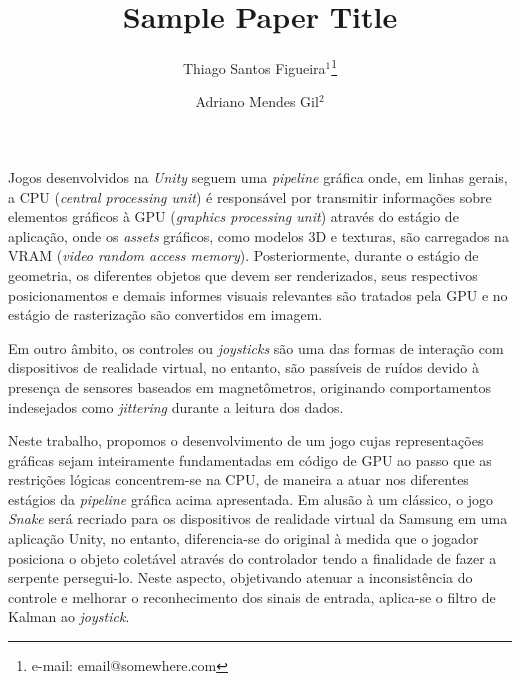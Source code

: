 \documentclass{vgtc}                          %
\title{Sample Paper Title}
\author{Thiago Santos Figueira$^{1}$\thanks{e-mail: email@somewhere.com} %
\and Adriano Mendes Gil$^{2}$}
\affiliation{\scriptsize $^{1}$Research institute X, Department, Country\\
$^{2}$University B, Department, Country\\
$^{3}$Company C, Department, Country}
\begin{document}


\maketitle

Jogos desenvolvidos na \textit{Unity} seguem uma \textit{pipeline} gráfica onde, em linhas gerais, a CPU (\textit{central processing unit}) é responsável por transmitir informações sobre elementos gráficos à GPU (\textit{graphics processing unit}) através do estágio de aplicação, onde os \textit{assets} gráficos, como modelos 3D e texturas, são carregados na VRAM (\textit{video random access memory}). Posteriormente, durante o estágio de geometria, os diferentes objetos que devem ser renderizados, seus respectivos posicionamentos e demais informes visuais relevantes são tratados pela GPU e no estágio de rasterização são convertidos em imagem\cite{akenine2008real}.

Em outro âmbito, os controles ou \textit{joysticks} são uma das formas de interação com dispositivos de realidade virtual, no entanto, são passíveis de ruídos devido à presença de sensores baseados em magnetômetros, originando comportamentos indesejados como \textit{jittering} durante a leitura dos dados. 

Neste trabalho, propomos o desenvolvimento de um jogo cujas representações gráficas sejam inteiramente fundamentadas em código de GPU ao passo que as restrições lógicas concentrem-se na CPU, de maneira a atuar nos diferentes estágios da \textit{pipeline} gráfica acima apresentada. Em alusão à um clássico, o jogo \textit{Snake} será recriado para os dispositivos de realidade virtual da Samsung em uma aplicação Unity, no entanto, diferencia-se do original à medida que o jogador posiciona o objeto coletável através do controlador tendo a finalidade de fazer a serpente persegui-lo. Neste aspecto, objetivando atenuar a inconsistência do controle e melhorar o reconhecimento dos sinais de entrada, aplica-se o filtro de Kalman ao \textit{joystick}.
\end{document}

